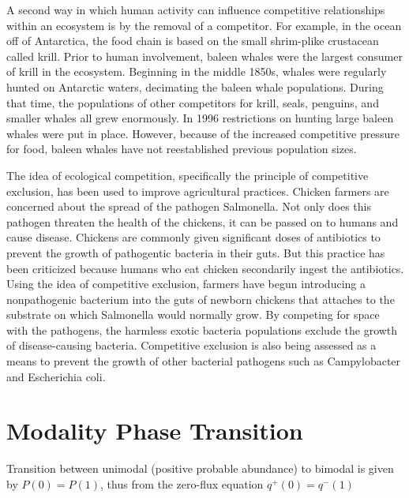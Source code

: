 \documentclass[%
 amsmath,amssymb,
 reprint,%
]{revtex4-2}
\begin{document}
\begin{widetext}
A second way in which human activity can influence competitive relationships within an ecosystem is by the removal of a competitor. For example, in the ocean off of Antarctica, the food chain is based on the small shrim-plike crustacean called krill. Prior to human involvement, baleen whales were the largest consumer of krill in the ecosystem. Beginning in the middle 1850s, whales were regularly hunted on Antarctic waters, decimating the baleen whale populations. During that time, the populations of other competitors for krill, seals, penguins, and smaller whales all grew enormously. In 1996 restrictions on hunting large baleen whales were put in place. However, because of the increased competitive pressure for food, baleen whales have not reestablished previous population sizes.

The idea of ecological competition, specifically the principle of competitive exclusion, has been used to improve agricultural practices. Chicken farmers are concerned about the spread of the pathogen Salmonella. Not only does this pathogen threaten the health of the chickens, it can be passed on to humans and cause disease. Chickens are commonly given significant doses of antibiotics to prevent the growth of pathogentic bacteria in their guts. But this practice has been criticized because humans who eat chicken secondarily ingest the antibiotics. Using the idea of competitive exclusion, farmers have begun introducing a nonpathogenic bacterium into the guts of newborn chickens that attaches to the substrate on which Salmonella would normally grow. By competing for space with the pathogens, the harmless exotic bacteria populations exclude the growth of disease-causing bacteria. Competitive exclusion is also being assessed as a means to prevent the growth of other bacterial pathogens such as Campylobacter and Escherichia coli.

\fi

\section{Modality Phase Transition}
 Transition between unimodal (positive probable abundance) to bimodal is given by $P(0)=P(1)$, thus from the zero-flux equation $q^+(0)=q^-(1)$ 
  

\end{widetext}
\end{document}

